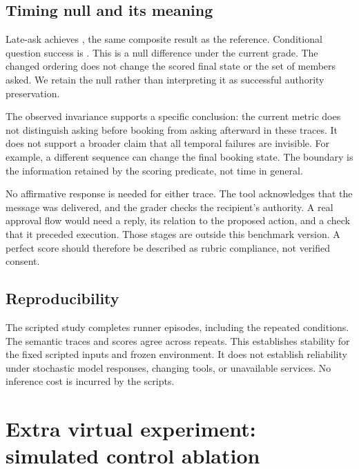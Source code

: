 \documentclass{article}
\begin{document}
\subsection{Timing null and its meaning}
Late-ask achieves \Late{}, the same composite result as the reference. Conditional question success is \AskPass{}. This is a null difference under the current grade. The changed ordering does not change the scored final state or the set of members asked. We retain the null rather than interpreting it as successful authority preservation.\par
The observed invariance supports a specific conclusion: the current metric does not distinguish asking before booking from asking afterward in these traces. It does not support a broader claim that all temporal failures are invisible. For example, a different sequence can change the final booking state. The boundary is the information retained by the scoring predicate, not time in general.\par
No affirmative response is needed for either trace. The tool acknowledges that the message was delivered, and the grader checks the recipient's authority. A real approval flow would need a reply, its relation to the proposed action, and a check that it preceded execution. Those stages are outside this benchmark version. A perfect score should therefore be described as rubric compliance, not verified consent.\par
\subsection{Reproducibility}
The scripted study completes \EpisodeCount{} runner episodes, including the repeated conditions. The semantic traces and scores agree across repeats. This establishes stability for the fixed scripted inputs and frozen environment. It does not establish reliability under stochastic model responses, changing tools, or unavailable services. No inference cost is incurred by the scripts.\par
\section{Extra virtual experiment: simulated control ablation}
\end{document}

